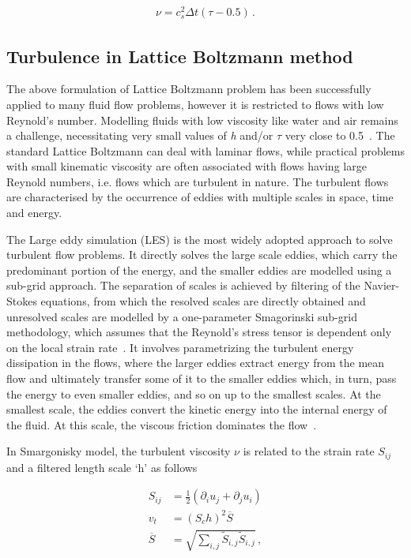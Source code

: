 \begin{align}
\nu=c_s^2\Delta t(\tau-0.5)\,.
\end{align}


\subsection{Turbulence in Lattice Boltzmann method}

The above formulation of Lattice Boltzmann problem has been successfully 
applied to many fluid flow problems, however it is restricted to flows with low 
Reynold's number. Modelling fluids with low viscosity like water and air 
remains a challenge, necessitating very small values of \textit{h} and/or 
$\tau$ very close to 0.5~\citep{He1997}. The standard Lattice Boltzmann can 
deal with laminar flows, while practical problems with small kinematic 
viscosity are often associated with flows having large Reynold numbers, i.e. 
flows which are turbulent in nature. The turbulent flows are characterised by 
the occurrence of eddies with multiple scales in space, time and energy.

The Large eddy simulation (LES) is the most widely adopted approach to solve 
turbulent flow problems. It directly solves the large scale eddies, which carry 
the predominant portion of the energy, and the smaller eddies are modelled 
using a sub-grid approach. The separation of scales is achieved by filtering of 
the Navier-Stokes equations, from which the resolved scales are directly 
obtained and unresolved scales are modelled by a one-parameter Smagorinski 
sub-grid methodology, which assumes that the Reynold's stress tensor is 
dependent only on the local strain rate~\citep{Smagorinsky1963}. It involves 
parametrizing the turbulent energy dissipation in the flows, where the larger 
eddies extract energy from the mean flow and ultimately transfer some of it to 
the smaller eddies which, in turn, pass the energy to even smaller eddies, and 
so on up to the smallest scales. At the smallest scale, the eddies convert the 
kinetic energy into the internal energy of the fluid. At this scale, the 
viscous friction dominates the flow~\citep{Frisch1995}.

In Smargonisky model, the turbulent viscosity $\nu$ is related to the strain 
rate $S_{ij}$ and a filtered length scale `h' as follows

\begin{align}
S_{ij} & = \frac{1}{2}(\partial_i u_j + \partial_j u_i) \\
\mathit{v}_{\mathit{t}} & = (\mathit{S}_{c}\mathit{h})^{2}\overline{S} \\
\overline{S} & =  
\sqrt{\sum\limits_{\mathit{i,j}}{\tilde{S}_{\mathit{i,j}}\tilde{S}_{\mathit{i,j}}}}\,,
\end{align}

